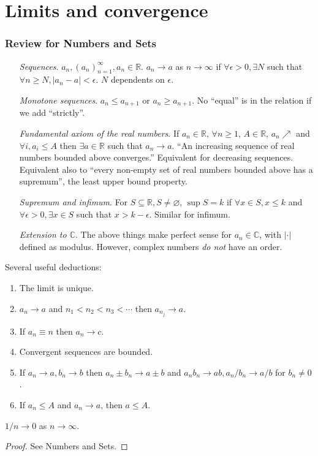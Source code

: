 \section{Limits and convergence}
\subsubsection*{Review for Numbers and Sets}
\begin{enumerate}[align=left]
    \item[\textit{Sequences}.] $ a_n, (a_n)_{n=1}^{\infty}, a_n\in \mathbb{R}  $. $ a_n\to a $ as $n\to \infty$ if $ \forall \epsilon>0, \exists N $ such that $ \forall n\ge N, |a_n-a|<\epsilon $. $N$ dependents on $\epsilon$. 
    \item[\textit{Monotone sequences}.] $ a_n\le a_{n+1} $ or $ a_n\ge a_{n+1} $. No ``equal'' is in the relation if we add ``strictly''.
    \item[\textit{Fundamental axiom of the real numbers}.] If $ a_n\in \mathbb{R}  $, $ \forall n\ge 1 $, $A\in \mathbb{R}$, $ a_n \nearrow $ and $ \forall i, a_i\le A $ then $ \exists a\in \mathbb{R} $ such that $a_n\to a$. ``An increasing sequence of real numbers bounded above converges.'' Equivalent for decreasing sequences. Equivalent also to ``every non-empty set of real numbers bounded above has a supremum'', the least upper bound property.
    \item[\textit{Supremum and infimum}.] For $ S \subseteq \mathbb{R}, S\neq \varnothing  $, $ \sup S=k $ if $ \forall x\in S, x\le k $ and $ \forall \epsilon>0, \exists x\in S $ such that $ x>k-\epsilon $. Similar for infimum.
    \item[\textit{Extension to $\mathbb{C}$}.] The above things make perfect sense for $ a_n\in \mathbb{C} $, with $ |\cdot| $ defined as modulus. However, complex numbers \textit{do not} have an order.
\end{enumerate}

Several useful deductions:
\begin{lemma}\label{lma:1.1}
    \begin{enumerate}
        \item The limit is unique.
        \item $ a_n\to a $ and $n_1<n_2<n_3<\cdots$ then $ a_{n_j}\to a $.
        \item If $ a_n\equiv n $ then $a_n\to c$.
        \item Convergent sequences are bounded.
        \item If $ a_n\to a,b_n\to b $ then $ a_n\pm b_n\to a\pm b $ and $ a_nb_n\to ab, a_n/b_n\to a/b $ for $b_n\neq 0$.
        \item If $ a_n\le A $ and $a_n\to a$, then $a\le A$.
    \end{enumerate}
\end{lemma}
\begin{lemma}[Archimedes]\label{lma:1.2}
    $ 1/n\to 0 $ as $ n\to \infty $.
\end{lemma}
\begin{proof}
    See Numbers and Sets.
\end{proof}